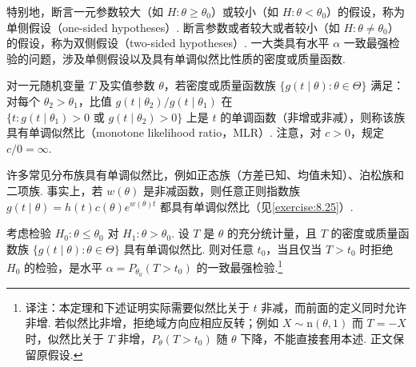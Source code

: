 特别地，断言一元参数较大（如 $H:\theta\ge\theta_0$）或较小（如 $H:\theta<\theta_0$）的假设，称为单侧假设（one-sided hypotheses\mbox{）.} 断言参数或者较大或者较小（如 $H:\theta\ne\theta_0$）的假设，称为双侧假设（two-sided hypotheses\mbox{）.} 一大类具有水平 $\alpha$ 一致最强检验的问题，涉及单侧假设以及具有单调似然比性质的密度或质量函数.
\begin{definition}\label{def:8.3.16}
对一元随机变量 $T$ 及实值参数 $\theta$，若密度或质量函数族 $\{g(t\mid\theta):\theta\in\Theta\}$ 满足：对每个 $\theta_2>\theta_1$，比值 $g(t\mid\theta_2)/g(t\mid\theta_1)$ 在 $\{t:g(t\mid\theta_1)>0\text{ 或 }g(t\mid\theta_2)>0\}$ 上是 $t$ 的单调函数（非增或非减），则称该族具有单调似然比（monotone likelihood ratio，MLR\mbox{）.} 注意，对 $c>0$，规定 $c/0=\infty$.
\end{definition}
许多常见分布族具有单调似然比，例如正态族（方差已知、均值未知）、泊松族和二项族. 事实上，若 $w(\theta)$ 是非减函数，则任意正则指数族 $g(t\mid\theta)=h(t)c(\theta)e^{w(\theta)t}$ 都具有单调似然比（见\autoref{exercise:8.25}\mbox{）.}
\begin{theorem}\label{thm:8.3.17}
考虑检验 $H_0:\theta\le\theta_0$ 对 $H_1:\theta>\theta_0$. 设 $T$ 是 $\theta$ 的充分统计量，且 $T$ 的密度或质量函数族 $\{g(t\mid\theta):\theta\in\Theta\}$ 具有单调似然比. 则对任意 $t_0$，当且仅当 $T>t_0$ 时拒绝 $H_0$ 的检验，是水平 $\alpha=P_{\theta_0}(T>t_0)$ 的一致最强检验.\footnote{译注：本定理和下述证明实际需要似然比关于 $t$ 非减，而前面的定义同时允许非增. 若似然比非增，拒绝域方向应相应反转；例如 $X\sim\mathrm n(\theta,1)$ 而 $T=-X$ 时，似然比关于 $T$ 非增，$P_\theta(T>t_0)$ 随 $\theta$ 下降，不能直接套用本述. 正文保留原假设.}
\end{theorem}
